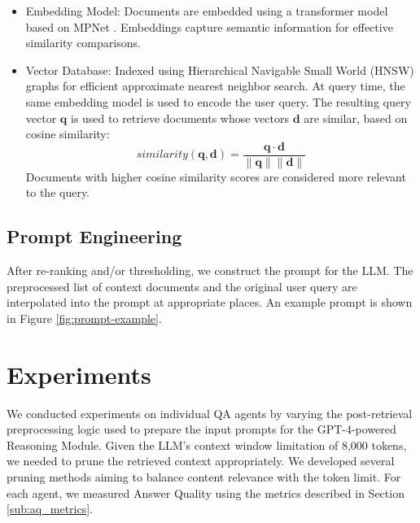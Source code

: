 \documentclass[sigconf,nonacm]{acmart}
\begin{document}
\begin{itemize}
\item Embedding Model: Documents are embedded using a transformer model based on MPNet \cite{mpnet}.  Embeddings capture semantic information for effective similarity comparisons.
\item Vector Database: Indexed using Hierarchical Navigable Small World (HNSW) graphs \cite{hnsw} for efficient approximate nearest neighbor search.
At query time, the same embedding model is used to encode the user query. The resulting query vector $\mathbf{q}$ is used to retrieve documents whose vectors $\mathbf{d}$ are similar, based on cosine similarity:
$$
similarity(\mathbf{q}, \mathbf{d}) = \frac{\mathbf{q} \cdot \mathbf{d}}{\|\mathbf{q}\| \|\mathbf{d}\|}
$$
Documents with higher cosine similarity scores are considered more relevant to the query.
\end{itemize}





\subsection{Prompt Engineering}
\label{sub:prompt_engineering}
After re-ranking and/or thresholding, we construct the prompt for the LLM. The preprocessed list of context documents and the original user query are interpolated into the prompt at appropriate places. An example prompt is shown in Figure \ref{fig:prompt-example}.


\section{Experiments}

We conducted experiments on individual QA agents by varying the post-retrieval preprocessing logic used to prepare the input prompts for the GPT-4-powered Reasoning Module. Given the LLM's context window limitation of 8,000 tokens, we needed to prune the retrieved context appropriately. We developed several pruning methods aiming to balance content relevance with the token limit. For each agent, we measured Answer Quality using the metrics described in Section \ref{sub:aq_metrics}.
\end{document}
